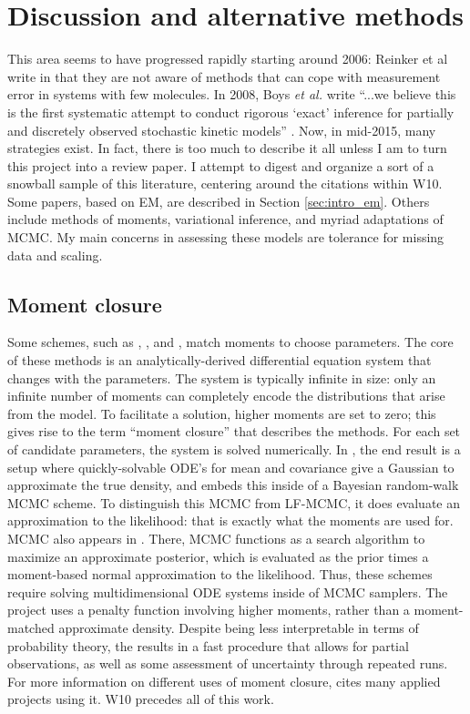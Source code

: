 \documentclass{article}
\begin{document}
\section{Discussion and alternative methods}
This area seems to have progressed rapidly starting around 2006: Reinker et al write in \cite{reinker2006parameter} that they are not aware of methods that can cope with measurement error in systems with few molecules. In 2008, Boys \textit{et al.} write ``...we believe this is
the first systematic attempt to conduct rigorous `exact' inference for partially and discretely observed stochastic kinetic models'' \cite{Boys2008}. Now, in mid-2015, many strategies exist. In fact, there is too much to describe it all unless I am to turn this project into a review paper. I attempt to digest and organize a sort of a snowball sample of this literature, centering around the citations within W10. Some papers, based on EM, are described in Section \ref{sec:intro_em}. Others include methods of moments, variational inference, and myriad adaptations of MCMC. My main concerns in assessing these models are tolerance for missing data and scaling.

\subsection{Moment closure}
Some schemes, such as \cite{milner2013moment}, \cite{kugler2012moment}, and \cite{zechner2012moment}, match moments to choose parameters. The core of these methods is an analytically-derived differential equation system that changes with the parameters. The system is typically infinite in size: only an infinite number of moments can completely encode the distributions that arise from the model. To facilitate a solution, higher moments are set to zero; this gives rise to the term ``moment closure'' that describes the methods. For each set of candidate parameters, the system is solved numerically. In \cite{milner2013moment}, the end result is a setup where quickly-solvable ODE's for mean and covariance give a Gaussian to approximate the true density, and \cite{milner2013moment} embeds this inside of a Bayesian random-walk MCMC scheme. To distinguish this MCMC from LF-MCMC, it does evaluate an approximation to the likelihood: that is exactly what the moments are used for. MCMC also appears in \cite{zechner2012moment}. There, MCMC functions as a search algorithm to maximize an approximate posterior, which is evaluated as the prior times a moment-based normal approximation to the likelihood. Thus, these schemes require solving multidimensional ODE systems inside of MCMC samplers. The project  \cite{kugler2012moment} uses a penalty function involving higher moments, rather than a moment-matched approximate density. Despite being less interpretable in terms of probability theory, the results in a fast procedure that allows for partial observations, as well as some assessment of uncertainty through repeated runs. For more information on different uses of moment closure, \cite{Milner201199} cites many applied projects using it. W10 precedes all of this work. 
\end{document}
